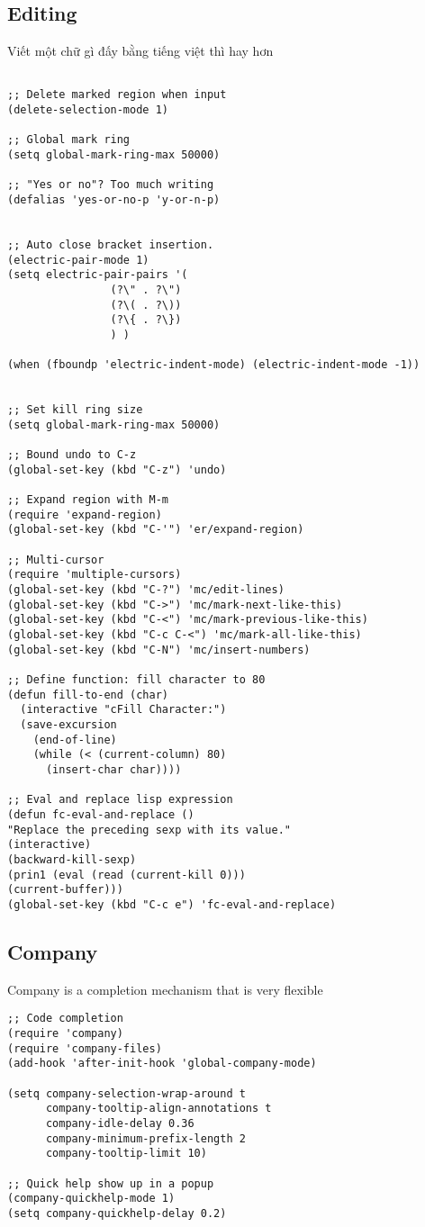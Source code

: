 \documentclass[11pt]{article}
\begin{document}
\subsection{Editing}
\label{sec:org8622ded}
Viết một chữ gì đấy bằng tiếng việt thì hay hơn
\begin{verbatim}

;; Delete marked region when input
(delete-selection-mode 1)

;; Global mark ring
(setq global-mark-ring-max 50000)

;; "Yes or no"? Too much writing
(defalias 'yes-or-no-p 'y-or-n-p)


;; Auto close bracket insertion.
(electric-pair-mode 1)
(setq electric-pair-pairs '(
			    (?\" . ?\")
			    (?\( . ?\))
			    (?\{ . ?\})
			    ) )

(when (fboundp 'electric-indent-mode) (electric-indent-mode -1))


;; Set kill ring size
(setq global-mark-ring-max 50000)

;; Bound undo to C-z
(global-set-key (kbd "C-z") 'undo)

;; Expand region with M-m
(require 'expand-region)
(global-set-key (kbd "C-'") 'er/expand-region)

;; Multi-cursor
(require 'multiple-cursors)
(global-set-key (kbd "C-?") 'mc/edit-lines)
(global-set-key (kbd "C->") 'mc/mark-next-like-this)
(global-set-key (kbd "C-<") 'mc/mark-previous-like-this)
(global-set-key (kbd "C-c C-<") 'mc/mark-all-like-this)
(global-set-key (kbd "C-N") 'mc/insert-numbers)

;; Define function: fill character to 80
(defun fill-to-end (char)
  (interactive "cFill Character:")
  (save-excursion
    (end-of-line)
    (while (< (current-column) 80)
      (insert-char char))))

;; Eval and replace lisp expression
(defun fc-eval-and-replace ()
"Replace the preceding sexp with its value."
(interactive)
(backward-kill-sexp)
(prin1 (eval (read (current-kill 0)))
(current-buffer)))
(global-set-key (kbd "C-c e") 'fc-eval-and-replace)

\end{verbatim}

\subsection{Company}
\label{sec:org8d90c99}
Company is a completion mechanism that is very flexible

\begin{verbatim}
;; Code completion
(require 'company)
(require 'company-files)
(add-hook 'after-init-hook 'global-company-mode)

(setq company-selection-wrap-around t
      company-tooltip-align-annotations t
      company-idle-delay 0.36
      company-minimum-prefix-length 2
      company-tooltip-limit 10)

;; Quick help show up in a popup
(company-quickhelp-mode 1)
(setq company-quickhelp-delay 0.2)

\end{verbatim}
\end{document}
